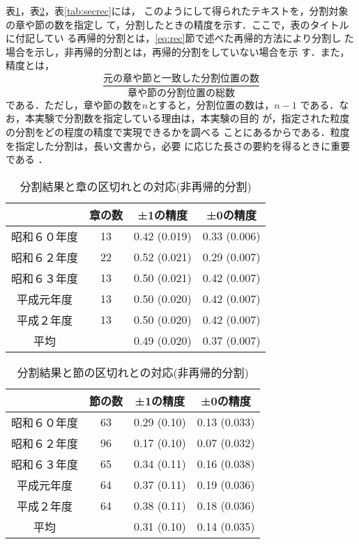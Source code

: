表\ref{tab:chap}，表\ref{tab:secnorec}，表\ref{tab:secrec}には，
このようにして得られたテキストを，分割対象の章や節の数を指定し
て，分割したときの精度を示す．ここで，表のタイトルに付記してい
る再帰的分割とは，\ref{eq:rec}節で述べた再帰的方法により分割し
た場合を示し，非再帰的分割とは，再帰的分割をしていない場合を示
す．また，精度とは，
\begin{displaymath}
  \frac{元の章や節と一致した分割位置の数}{章や節の分割位置の総数}
\end{displaymath}
である．ただし，章や節の数を$n$とすると，分割位置の数は，$n-1$
である．なお，本実験で分割数を指定している理由は，本実験の目的
が，指定された粒度の分割をどの程度の精度で実現できるかを調べる
ことにあるからである．粒度を指定した分割は，長い文書から，必要
に応じた長さの要約を得るときに重要である
\cite{nakao00:_algor_one_summar_long_text}．

\begin{table}[htbp]
  \begin{center}
    \caption{分割結果と章の区切れとの対応(非再帰的分割)}
    \begin{tabular}{|c|ccc|}\hline
                   & 章の数 & ±1の精度     & ±0の精度\\ \hline
      昭和６０年度 & 13     & 0.42 (0.019) & 0.33 (0.006)\\
      昭和６２年度 & 22     & 0.52 (0.021) & 0.29 (0.007)\\
      昭和６３年度 & 13     & 0.50 (0.021) & 0.42 (0.007)\\
      平成元年度   & 13     & 0.50 (0.020) & 0.42 (0.007)\\
      平成２年度   & 13     & 0.50 (0.020) & 0.42 (0.007)\\\hline
      平均         &        & 0.49 (0.020) & 0.37 (0.007)\\\hline
    \end{tabular}
    \label{tab:chap}
  \end{center}
\end{table}

\begin{table}[htbp]
  \begin{center}
    \caption{分割結果と節の区切れとの対応(非再帰的分割)}
    \begin{tabular}{|c|ccc|}\hline
                   & 節の数 & ±1の精度     & ±0の精度\\ \hline
      昭和６０年度 & 63     & 0.29 (0.10) & 0.13 (0.033)\\
      昭和６２年度 & 96     & 0.17 (0.10) & 0.07 (0.032)\\
      昭和６３年度 & 65     & 0.34 (0.11) & 0.16 (0.038)\\
      平成元年度   & 64     & 0.37 (0.11) & 0.19 (0.036)\\
      平成２年度   & 64     & 0.38 (0.11) & 0.18 (0.036)\\\hline
      平均         &        & 0.31 (0.10) & 0.14 (0.035)\\\hline
    \end{tabular}
    \label{tab:secnorec}
  \end{center}
\end{table}

